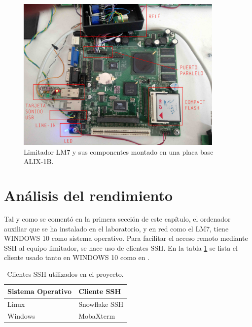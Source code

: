 \begin{figure}[h]
    \centering
    \includegraphics[width=0.9\textwidth]{imagenes/lm7-fotos/lms7-comps.jpg}
    \caption{Limitador LM7 y sus componentes montado en una placa base ALIX-1B.}
	\label{img:lms7}
\end{figure}

\section{Análisis del rendimiento} \label{sec:lms7-performance}

Tal y como se comentó en la primera sección de este capítulo, el ordenador auxiliar que se ha instalado en el laboratorio, y en red como el \gls{LM7}, tiene \gls{WINDOWS} 10 como sistema operativo. Para facilitar el acceso remoto mediante \acrshort{SSH} al equipo limitador, se hace uso de clientes \acrshort{SSH}. En la tabla \ref{tab:gestoresSSH} se lista el cliente usado tanto en \gls{WINDOWS} 10 como en .

\begin{table}[h]
    \centering
    \begin{tabular}{|l|l|}
        \hline
        \rowcolor[HTML]{ECF4FF}
        Sistema Operativo & Cliente SSH   \\ \hline
        Linux             & Snowflake SSH \\ \hline
        Windows           & MobaXterm     \\ \hline
    \end{tabular}
    \caption{Clientes \acrshort{SSH} utilizados en el proyecto.}
    \label{tab:gestoresSSH}
\end{table}


